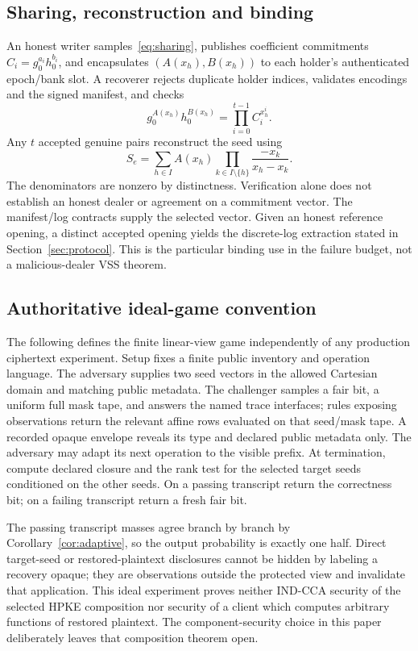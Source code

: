 \documentclass[pdflatex,sn-mathphys-num]{sn-jnl}
\theoremstyle{plain}
\theoremstyle{definition}
\begin{document}
\begin{appendices}
\subsection{Sharing, reconstruction and binding}
An honest writer samples~\eqref{eq:sharing}, publishes coefficient commitments $C_i=g_0^{a_i}h_0^{b_i}$, and encapsulates $(A(x_h),B(x_h))$ to each holder's authenticated epoch/bank slot. A recoverer rejects duplicate holder indices, validates encodings and the signed manifest, and checks
\[
 g_0^{A(x_h)}h_0^{B(x_h)}=\prod_{i=0}^{t-1}C_i^{x_h^i}.
\]
Any $t$ accepted genuine pairs reconstruct the seed using
\[
 S_e=\sum_{h\in I} A(x_h)
 \prod_{k\in I\setminus\{h\}}\frac{-x_k}{x_h-x_k}.
\]
The denominators are nonzero by distinctness. Verification alone does not establish an honest dealer or agreement on a commitment vector. The manifest/log contracts supply the selected vector. Given an honest reference opening, a distinct accepted opening yields the discrete-log extraction stated in Section~\ref{sec:protocol}. This is the particular binding use in the failure budget, not a malicious-dealer VSS theorem.

\subsection{Authoritative ideal-game convention}
The following defines the finite linear-view game independently of any production ciphertext experiment. Setup fixes a finite public inventory and operation language. The adversary supplies two seed vectors in the allowed Cartesian domain and matching public metadata. The challenger samples a fair bit, a uniform full mask tape, and answers the named trace interfaces; rules exposing observations return the relevant affine rows evaluated on that seed/mask tape. A recorded opaque envelope reveals its type and declared public metadata only. The adversary may adapt its next operation to the visible prefix. At termination, compute declared closure and the rank test for the selected target seeds conditioned on the other seeds. On a passing transcript return the correctness bit; on a failing transcript return a fresh fair bit.

The passing transcript masses agree branch by branch by Corollary~\ref{cor:adaptive}, so the output probability is exactly one half. Direct target-seed or restored-plaintext disclosures cannot be hidden by labeling a recovery opaque; they are observations outside the protected view and invalidate that application. This ideal experiment proves neither IND-CCA security of the selected HPKE composition nor security of a client which computes arbitrary functions of restored plaintext. The component-security choice in this paper deliberately leaves that composition theorem open.


\end{appendices}
\end{document}
